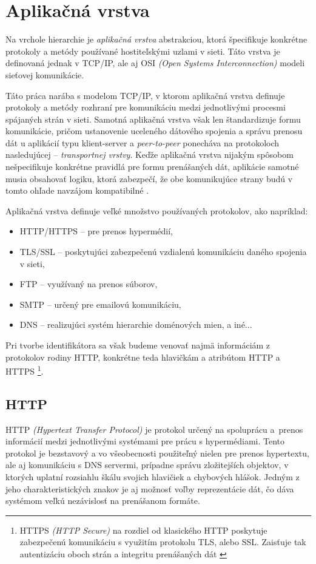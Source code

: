 \documentclass[
  digital, %
  oneside, %
  table,   %
  lof,     %
  nolot,   %
  nocover
]{fithesis3}
\begin{document}
\section{Aplikačná vrstva}
Na vrchole hierarchie je \textit{aplikačná vrstva} abstrakciou, ktorá špecifikuje
konkrétne protokoly a metódy používané hostiteľskými uzlami v sieti. Táto
vrstva je definovaná jednak v TCP/IP, ale aj OSI
\textit{(Open Systems Interconnection)} modeli sieťovej komunikácie.

Táto práca narába s modelom TCP/IP, v ktorom aplikačná vrstva definuje
protokoly a metódy rozhraní pre komunikáciu medzi jednotlivými procesmi
spájaných strán v sieti. Samotná aplikačná vrstva však len štandardizuje formu
komunikácie, pričom ustanovenie uceleného dátového spojenia a správu prenosu dát
u aplikácií typu klient-server a \textit{peer-to-peer} ponecháva na protokoloch
nasledujúcej -- \textit{transportnej vrstvy}. Keďže aplikačná vrstva nijakým spôsobom
nešpecifikuje konkrétne pravidlá pre formu prenášaných dát,
aplikácie samotné musia obsahovať logiku, ktorá zabezpečí, že obe komunikujúce
strany budú v tomto ohľade navzájom kompatibilné \cite{rfc1123}.

Aplikačná vrstva definuje veľké množstvo používaných protokolov, ako napríklad:
\begin{itemize}
	\item HTTP/HTTPS -- pre prenos hypermédií, 
	\item TLS/SSL -- poskytujúci zabezpečenú vzdialenú komunikáciu daného spojenia v sieti,
	\item FTP -- využívaný na prenos súborov,
	\item SMTP -- určený pre emailovú komunikáciu,
	\item DNS -- realizujúci systém hierarchie doménových mien, a iné...
\end{itemize}
Pri tvorbe identifikátora sa však budeme venovať najmä informáciám z protokolov
rodiny HTTP, konkrétne teda hlavičkám a atribútom HTTP a HTTPS \footnote{HTTPS 
\textit{(HTTP Secure)} na rozdiel od klasického HTTP poskytuje zabezpečenú komunikáciu
s využitím protokolu TLS, alebo SSL. Zaisťuje tak autentizáciu oboch strán a integritu prenášaných dát \cite{rfc2818}}.

\subsection{HTTP}
HTTP \textit{(Hypertext Transfer Protocol)} je protokol určený
na spoluprácu a~prenos informácií medzi jednotlivými systémami pre
prácu s hypermédiami. Tento protokol je bezstavový a vo všeobecnosti
použiteľný nielen pre prenos hypertextu, ale aj komunikáciu s DNS servermi, prípadne
správu zložitejších objektov, v ktorých uplatní rozsiahlu škálu svojich
hlavičiek a chybových hlášok. Jedným z jeho charakteristických znakov je aj
možnosť voľby reprezentácie dát, čo dáva systémom veľkú nezávislosť na
prenášanom formáte.
\end{document}
